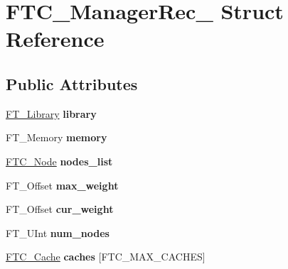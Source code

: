 \hypertarget{struct_f_t_c___manager_rec__}{}\section{F\+T\+C\+\_\+\+Manager\+Rec\+\_\+ Struct Reference}
\label{struct_f_t_c___manager_rec__}
\subsection*{Public Attributes}
\begin{DoxyCompactItemize}
\item 
\mbox{\label{struct_f_t_c___manager_rec___ac4679515b99c81a420ea87e56090e3ae}} 
\hyperlink{struct_f_t___library_rec__}{F\+T\+\_\+\+Library} {\bfseries library}
\item 
\mbox{\label{struct_f_t_c___manager_rec___a6dc4a419a2baab7cd2e4e53bbbd4a615}} 
F\+T\+\_\+\+Memory {\bfseries memory}
\item 
\mbox{\label{struct_f_t_c___manager_rec___ab620c724228740e1d4a763c1b66063cc}} 
\hyperlink{struct_f_t_c___node_rec__}{F\+T\+C\+\_\+\+Node} {\bfseries nodes\+\_\+list}
\item 
\mbox{\label{struct_f_t_c___manager_rec___a9eb90214e3354d15230a84ad26a69ded}} 
F\+T\+\_\+\+Offset {\bfseries max\+\_\+weight}
\item 
\mbox{\label{struct_f_t_c___manager_rec___a372aa28c86e3b42205eaaf9b80f6d1de}} 
F\+T\+\_\+\+Offset {\bfseries cur\+\_\+weight}
\item 
\mbox{\label{struct_f_t_c___manager_rec___acb4e07c3ab5aefc6ab3b13a47afa13d9}} 
F\+T\+\_\+\+U\+Int {\bfseries num\+\_\+nodes}
\item 
\mbox{\label{struct_f_t_c___manager_rec___a14cd0320b72265b1c0b037d779495f99}} 
\hyperlink{struct_f_t_c___cache_rec__}{F\+T\+C\+\_\+\+Cache} {\bfseries caches} \mbox{[}F\+T\+C\+\_\+\+M\+A\+X\+\_\+\+C\+A\+C\+H\+ES\mbox{]}
\item 
\mbox{\label{struct_f_t_c___manager_rec___a01415be8a05cc14bc91bfa56d8f4e004}} 

\end{DoxyCompactItemize}
